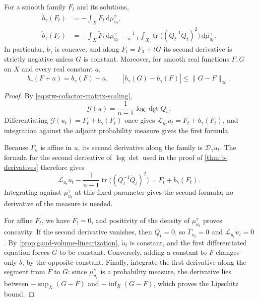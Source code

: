 \begin{theorem}\label{thm:gaud-volume-normalization-derivatives}
For a smooth family $F_t$ and its solutions,
\begin{align*}
 \dot b_\gamma(F_t)&=-\int_X\dot F_t\,\mathrm{d}\mu_{u_t}^\gamma,\\
 \ddot b_\gamma(F_t)&=-\int_X\ddot F_t\,\mathrm{d}\mu_{u_t}^\gamma
 -\frac1{n-1}\int_X
        \operatorname{tr}\bigl((Q_t^{-1}\dot Q_t)^2\bigr)
                          \,\mathrm{d}\mu_{u_t}^\gamma.
\end{align*}
In particular, $b_\gamma$ is concave, and along $F_t=F_0+tG$ its second derivative is strictly negative unless $G$ is constant. Moreover, for smooth real functions $F,G$ on $X$ and every real constant $a$,
\[
 b_\gamma(F+a)=b_\gamma(F)-a,
 \qquad |b_\gamma(G)-b_\gamma(F)|\leq\|G-F\|_\infty.
\]
\end{theorem}
\begin{proof}
By \eqref{eq:stw-cofactor-matrix-scaling},
\[
 \mathcal G(u)=\frac1{n-1}\log\det_\gamma Q_u.
\]
Differentiating $\mathcal G(u_t)=F_t+b_\gamma(F_t)$ once gives $\mathcal L_{u_t}\dot u_t=\dot F_t+\dot b_\gamma(F_t)$, and integration against the adjoint probability measure gives the first formula.

Because $\Gamma_u$ is affine in $u$, its second derivative along the family is $\mathcal D_\gamma\ddot u_t$. The formula for the second derivative of $\log\det$ used in the proof of \cref{thm:b-derivatives} therefore gives
\[
 \mathcal L_{u_t}\ddot u_t
 -\frac1{n-1}\operatorname{tr}\bigl((Q_t^{-1}\dot Q_t)^2\bigr)
 =\ddot F_t+\ddot b_\gamma(F_t).
\]
Integrating against $\mu_{u_t}^\gamma$ at this fixed parameter gives the second formula; no derivative of the measure is needed.

For affine $F_t$, we have $\ddot F_t=0$, and positivity of the density of $\mu_{u_t}^\gamma$ proves concavity. If the second derivative vanishes, then $\dot Q_t=0$, so $\dot\Gamma_{u_t}=0$ and $\mathcal L_{u_t}\dot u_t=0$. By \cref{prop:gaud-volume-linearization}, $\dot u_t$ is constant, and the first differentiated equation forces $G$ to be constant. Conversely, adding a constant to $F$ changes only $b$, by the opposite constant. Finally, integrate the first derivative along the segment from $F$ to $G$: since $\mu_{u_t}^\gamma$ is a probability measure, the derivative lies between $-\sup_X(G-F)$ and $-\inf_X(G-F)$, which proves the Lipschitz bound.
\end{proof}

